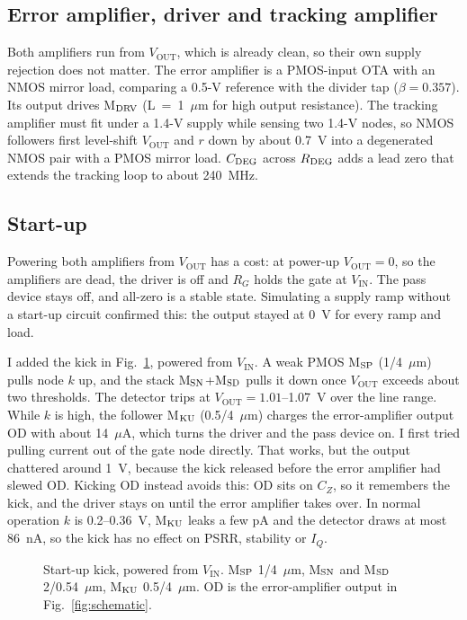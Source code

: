 \documentclass[conference]{IEEEtran}
\newcommand{\Vin}{V_{\mathrm{IN}}}\newcommand{\Vout}{V_{\mathrm{OUT}}}
\begin{document}
\subsection{Error amplifier, driver and tracking amplifier}
Both amplifiers run from $\Vout$, which is already clean, so their own supply rejection does not matter. The error amplifier is a PMOS-input OTA with an NMOS mirror load, comparing a 0.5-V reference with the divider tap ($\beta=0.357$). Its output drives M$_{\rm DRV}$ (L~=~1~$\mu$m for high output resistance). The tracking amplifier must fit under a 1.4-V supply while sensing two 1.4-V nodes, so NMOS followers first level-shift $\Vout$ and $r$ down by about 0.7~V into a degenerated NMOS pair with a PMOS mirror load. $C_{\rm DEG}$ across $R_{\rm DEG}$ adds a lead zero that extends the tracking loop to about 240~MHz.

\subsection{Start-up}
Powering both amplifiers from $\Vout$ has a cost: at power-up $\Vout=0$, so the amplifiers are dead, the driver is off and $R_G$ holds the gate at $\Vin$. The pass device stays off, and all-zero is a stable state. Simulating a supply ramp without a start-up circuit confirmed this: the output stayed at 0~V for every ramp and load.

I added the kick in Fig.~\ref{fig:startupckt}, powered from $\Vin$. A weak PMOS M$_{\rm SP}$ (1/4~$\mu$m) pulls node $k$ up, and the stack M$_{\rm SN}$+M$_{\rm SD}$ pulls it down once $\Vout$ exceeds about two thresholds. The detector trips at $\Vout=1.01$--1.07~V over the line range. While $k$ is high, the follower M$_{\rm KU}$ (0.5/4~$\mu$m) charges the error-amplifier output OD with about 14~$\mu$A, which turns the driver and the pass device on. I first tried pulling current out of the gate node directly. That works, but the output chattered around 1~V, because the kick released before the error amplifier had slewed OD. Kicking OD instead avoids this: OD sits on $C_Z$, so it remembers the kick, and the driver stays on until the error amplifier takes over. In normal operation $k$ is 0.2--0.36~V, M$_{\rm KU}$ leaks a few pA and the detector draws at most 86~nA, so the kick has no effect on PSRR, stability or $I_Q$.

\begin{figure}[!t]
\centering
\resizebox{.62\columnwidth}{!}{}
\caption{Start-up kick, powered from $\Vin$. M$_{\rm SP}$ 1/4~$\mu$m, M$_{\rm SN}$ and M$_{\rm SD}$ 2/0.54~$\mu$m, M$_{\rm KU}$ 0.5/4~$\mu$m. OD is the error-amplifier output in Fig.~\ref{fig:schematic}.}
\label{fig:startupckt}
\end{figure}
\end{document}
